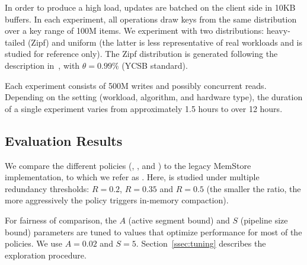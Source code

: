 In order to produce a high load, updates are batched on the client side in 10KB buffers. 
In each experiment, all operations draw keys from the same distribution over a key range
of 100M items. We experiment with two distributions: heavy-tailed (Zipf) and uniform (the latter 
is less representative of real workloads and is studied for reference only). The Zipf distribution 
is generated following the description in~\cite{Gray:1994:QGB:191839.191886}, with $\theta=0.99\%$ 
(YCSB standard).

Each experiment consists of 500M writes and possibly concurrent reads. 
Depending on the setting (workload, algorithm, and hardware type), 
the duration of 
a single experiment  varies from approximately 1.5 hours to over 12 hours.  

\subsection{Evaluation Results}
\label{ssec:results}

We compare the different \sys\/ policies (\basic, \eager, and \adp\/) to the legacy MemStore implementation, to which we refer as 
\none. Here, \adp\/ is studied under multiple 
redundancy thresholds: $R=0.2$, $R=0.35$ and $R=0.5$ (the smaller the ratio, the more aggressively
the policy triggers in-memory compaction).  

For fairness of comparison, the $A$ (active segment bound) and $S$ (pipeline size bound) parameters 
are tuned to values that optimize performance for most of the policies. We use $A=0.02$ and $S=5$.
Section~\ref{ssec:tuning} describes the exploration procedure. 

